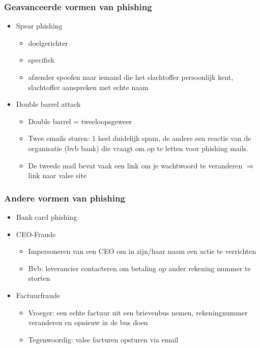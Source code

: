\documentclass{article}
\begin{document}
\subsubsection{Geavanceerde vormen van phishing}

\begin{itemize}
    \item Spear phishing
    \begin{itemize}
        \item doelgerichter
        \item specifiek
        \item afzender spoofen naar iemand die het slachtoffer persoonlijk kent, slachtoffer aanspreken met echte naam
    \end{itemize}
    \item Double barrel attack
    \begin{itemize}
        \item Double barrel = tweeloopsgeweer
        \item Twee emails sturen: 1 heel duidelijk spam, de andere een reactie van de organisatie (bvb bank) die vraagt om op te letten voor phishing mails. 
        \item De tweede mail bevat vaak een link om je wachtwoord te veranderen $\Rightarrow$ link naar valse site
    \end{itemize}
\end{itemize}

\subsubsection{Andere vormen van phishing}

\begin{itemize}
    \item Bank card phishing
    \item CEO-Fraude
    \begin{itemize}
        \item Impersoneren van een CEO om in zijn/haar naam een actie te verrichten
        \item Bvb: leverancier contacteren om betaling op ander rekening nummer te storten
    \end{itemize}
    \item Factuurfraude
    \begin{itemize}
        \item Vroeger: een echte factuur uit een brievenbus nemen, rekeningnummer veranderen en opnieuw in de bus doen
        \item Tegenwoordig: valse facturen opsturen via email
    \end{itemize}
\end{itemize}
\end{document}
